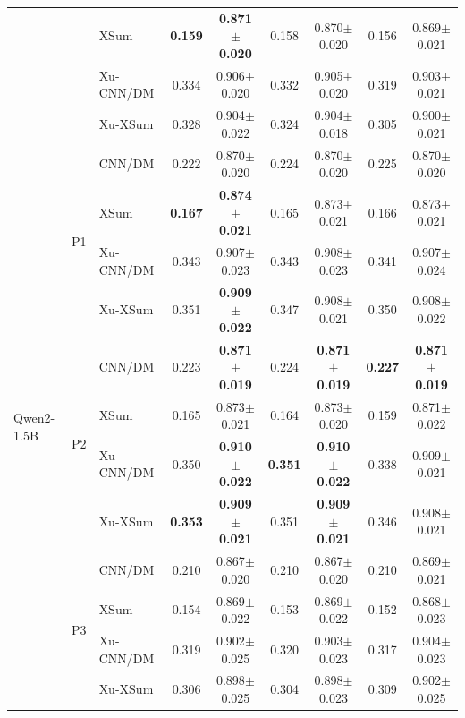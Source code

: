 \begin{table}[b]
{\begin{tabular}{lllcccccc}
 &  & XSum & \textbf{0.159} & \textbf{0.871{\scriptsize$\pm$0.020}} & 0.158 & 0.870{\scriptsize$\pm$0.020} & 0.156 & 0.869{\scriptsize$\pm$0.021} \\
 &  & Xu-CNN/DM & 0.334 & 0.906{\scriptsize$\pm$0.020} & 0.332 & 0.905{\scriptsize$\pm$0.020} & 0.319 & 0.903{\scriptsize$\pm$0.021} \\
 &  & Xu-XSum & 0.328 & 0.904{\scriptsize$\pm$0.022} & 0.324 & 0.904{\scriptsize$\pm$0.018} & 0.305 & 0.900{\scriptsize$\pm$0.021} \\
\midrule
\multirow{12}{*}{Qwen2-1.5B} & \multirow{4}{*}{P1} & CNN/DM & 0.222 & 0.870{\scriptsize$\pm$0.020} & 0.224 & 0.870{\scriptsize$\pm$0.020} & 0.225 & 0.870{\scriptsize$\pm$0.020} \\
 &  & XSum & \textbf{0.167} & \textbf{0.874{\scriptsize$\pm$0.021}} & 0.165 & 0.873{\scriptsize$\pm$0.021} & 0.166 & 0.873{\scriptsize$\pm$0.021} \\
 &  & Xu-CNN/DM & 0.343 & 0.907{\scriptsize$\pm$0.023} & 0.343 & 0.908{\scriptsize$\pm$0.023} & 0.341 & 0.907{\scriptsize$\pm$0.024} \\
 &  & Xu-XSum & 0.351 & \textbf{0.909{\scriptsize$\pm$0.022}} & 0.347 & 0.908{\scriptsize$\pm$0.021} & 0.350 & 0.908{\scriptsize$\pm$0.022} \\
\cmidrule(lr){2-9}
 & \multirow{4}{*}{P2} & CNN/DM & 0.223 & \textbf{0.871{\scriptsize$\pm$0.019}} & 0.224 & \textbf{0.871{\scriptsize$\pm$0.019}} & \textbf{0.227} & \textbf{0.871{\scriptsize$\pm$0.019}} \\
 &  & XSum & 0.165 & 0.873{\scriptsize$\pm$0.021} & 0.164 & 0.873{\scriptsize$\pm$0.020} & 0.159 & 0.871{\scriptsize$\pm$0.022} \\
 &  & Xu-CNN/DM & 0.350 & \textbf{0.910{\scriptsize$\pm$0.022}} & \textbf{0.351} & \textbf{0.910{\scriptsize$\pm$0.022}} & 0.338 & 0.909{\scriptsize$\pm$0.021} \\
 &  & Xu-XSum & \textbf{0.353} & \textbf{0.909{\scriptsize$\pm$0.021}} & 0.351 & \textbf{0.909{\scriptsize$\pm$0.021}} & 0.346 & 0.908{\scriptsize$\pm$0.021} \\
\cmidrule(lr){2-9}
 & \multirow{4}{*}{P3} & CNN/DM & 0.210 & 0.867{\scriptsize$\pm$0.020} & 0.210 & 0.867{\scriptsize$\pm$0.020} & 0.210 & 0.869{\scriptsize$\pm$0.021} \\
 &  & XSum & 0.154 & 0.869{\scriptsize$\pm$0.022} & 0.153 & 0.869{\scriptsize$\pm$0.022} & 0.152 & 0.868{\scriptsize$\pm$0.023} \\
 &  & Xu-CNN/DM & 0.319 & 0.902{\scriptsize$\pm$0.025} & 0.320 & 0.903{\scriptsize$\pm$0.023} & 0.317 & 0.904{\scriptsize$\pm$0.023} \\
 &  & Xu-XSum & 0.306 & 0.898{\scriptsize$\pm$0.025} & 0.304 & 0.898{\scriptsize$\pm$0.023} & 0.309 & 0.902{\scriptsize$\pm$0.025} \\
\bottomrule
\end{tabular}
}
\end{table}